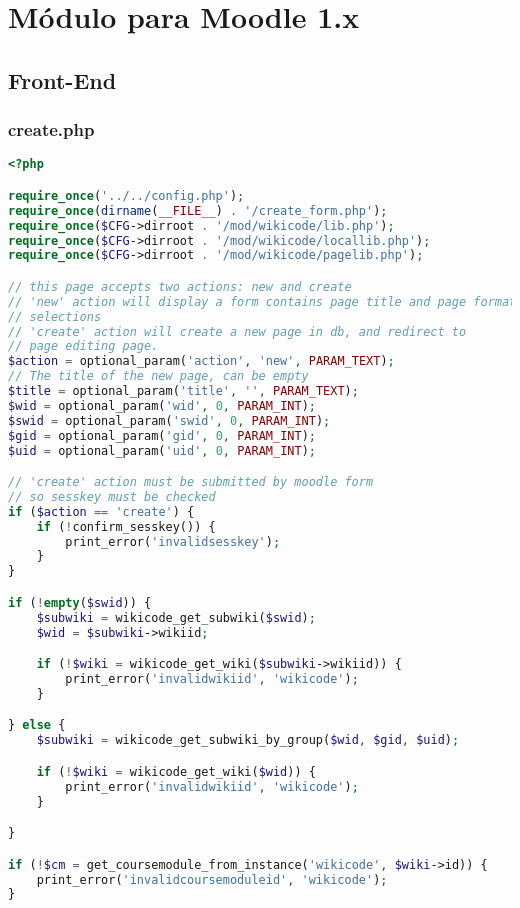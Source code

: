 \chapter[Módulo para Moodle 1.x]{\label{}
Módulo para Moodle 1.x}

\section{Front-End}

\subsection{create.php}
\begin{lstlisting}[language=PHP]
<?php

require_once('../../config.php');
require_once(dirname(__FILE__) . '/create_form.php');
require_once($CFG->dirroot . '/mod/wikicode/lib.php');
require_once($CFG->dirroot . '/mod/wikicode/locallib.php');
require_once($CFG->dirroot . '/mod/wikicode/pagelib.php');

// this page accepts two actions: new and create
// 'new' action will display a form contains page title and page format
// selections
// 'create' action will create a new page in db, and redirect to
// page editing page.
$action = optional_param('action', 'new', PARAM_TEXT);
// The title of the new page, can be empty
$title = optional_param('title', '', PARAM_TEXT);
$wid = optional_param('wid', 0, PARAM_INT);
$swid = optional_param('swid', 0, PARAM_INT);
$gid = optional_param('gid', 0, PARAM_INT);
$uid = optional_param('uid', 0, PARAM_INT);

// 'create' action must be submitted by moodle form
// so sesskey must be checked
if ($action == 'create') {
    if (!confirm_sesskey()) {
        print_error('invalidsesskey');
    }
}

if (!empty($swid)) {
    $subwiki = wikicode_get_subwiki($swid);
	$wid = $subwiki->wikiid;

    if (!$wiki = wikicode_get_wiki($subwiki->wikiid)) {
        print_error('invalidwikiid', 'wikicode');
    }

} else {
    $subwiki = wikicode_get_subwiki_by_group($wid, $gid, $uid);

    if (!$wiki = wikicode_get_wiki($wid)) {
        print_error('invalidwikiid', 'wikicode');
    }

}

if (!$cm = get_coursemodule_from_instance('wikicode', $wiki->id)) {
    print_error('invalidcoursemoduleid', 'wikicode');
}


\end{lstlisting}
